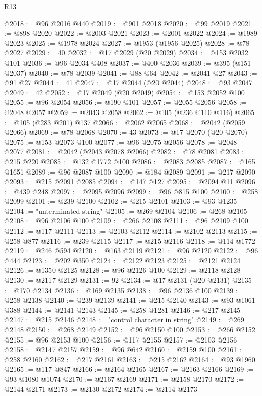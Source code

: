 \begin{lexlean}{R13}
\begin{coremodule}
@2018 := @96 @2016 @440
@2019 := @901 @2018
@2020 := @99 @2019
@2021 := @898 @2020
@2022 := @2003 @2021
@2023 := @2001 @2022
@2024 := @1989 @2023
@2025 := @1978 @2024
@2027 := @1953 (@1956 @2025)
@2028 := @78 @2027
@2029 := 40
@2032 := @17 @2029 (@20 @2029)
@2034 := @153 @2032 @101
@2036 := @96 @2034 @408
@2037 := @400 @2036
@2039 := @395 (@151 @2037)
@2040 := @78 @2039
@2041 := @88 @64
@2042 := @2041 @27
@2043 := @91 @27
@2044 := 41
@2047 := @17 @2044 (@20 @2044)
@2048 := @93 @2047
@2049 := 42
@2052 := @17 @2049 (@20 @2049)
@2054 := @153 @2052 @100
@2055 := @96 @2054
@2056 := @190 @101
@2057 := @2055 @2056
@2058 := @2048 @2057
@2059 := @2043 @2058
@2062 := @105 (@236 @110 @116)
@2065 := @105 (@283 @201) @137
@2066 := @2062 @2065
@2068 := @2042 (@2059 @2066)
@2069 := @78 @2068
@2070 := 43
@2073 := @17 @2070 (@20 @2070)
@2075 := @153 @2073 @100
@2077 := @96 @2075 @2056
@2078 := @2048 @2077
@2081 := @2042 (@2043 @2078 @2066)
@2082 := @78 @2081
@2083 := @215 @220
@2085 := @132 @1772 @100
@2086 := @2083 @2085
@2087 := @165 @1651
@2089 := @96 @2087 @100
@2090 := @184 @2089
@2091 := @217 @2090
@2093 := @215 @2091 @2085
@2094 := @147 @127
@2095 := @2094 @11
@2096 := @439 @248
@2097 := @2095 @2096
@2099 := @96 @815 @100
@2100 := @258 @2099
@2101 := @239 @2100
@2102 := @215 @2101
@2103 := @93 @1235
@2104 := "unterminated string"
@2105 := @269 @2104
@2106 := @268 @2105
@2108 := @96 @2106 @100
@2109 := @266 @2108
@2111 := @96 @2109 @100
@2112 := @117 @2111
@2113 := @2103 @2112
@2114 := @2102 @2113
@2115 := @258 @877
@2116 := @239 @2115
@2117 := @215 @2116
@2118 := @114 @1772
@2119 := @246 @594
@2120 := @163 @2119
@2121 := @96 @2120
@2122 := @96 @444
@2123 := @202 @350
@2124 := @2122 @2123
@2125 := @2121 @2124
@2126 := @1350 @2125
@2128 := @96 @2126 @100
@2129 := @2118 @2128
@2130 := @2117 @2129
@2131 := 92
@2134 := @17 @2131 (@20 @2131)
@2135 := @170 @2134
@2136 := @169 @2135
@2138 := @96 @2136 @100
@2139 := @258 @2138
@2140 := @239 @2139
@2141 := @215 @2140
@2143 := @93 @1061 @388
@2144 := @2141 @2143
@2145 := @258 @1281
@2146 := @217 @2145
@2147 := @215 @2146
@2148 := "control character in string"
@2149 := @269 @2148
@2150 := @268 @2149
@2152 := @96 @2150 @100
@2153 := @266 @2152
@2155 := @96 @2153 @100
@2156 := @117 @2155
@2157 := @2103 @2156
@2158 := @2147 @2157
@2159 := @96 @642
@2160 := @2159 @100
@2161 := @258 @2160
@2162 := @217 @2161
@2163 := @215 @2162
@2164 := @93 @1960
@2165 := @117 @847
@2166 := @2164 @2165
@2167 := @2163 @2166
@2169 := @93 @1080 @1074
@2170 := @2167 @2169
@2171 := @2158 @2170
@2172 := @2144 @2171
@2173 := @2130 @2172
@2174 := @2114 @2173

\end{coremodule}
\end{lexlean}
